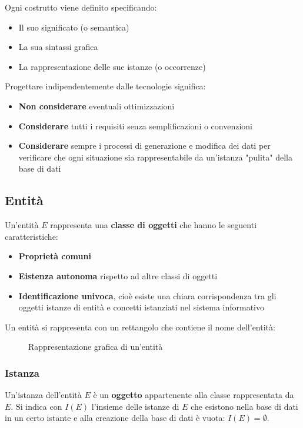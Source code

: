 \documentclass[a4paper]{article}
\begin{document}
\vspace{1em}
\noindent
Ogni costrutto viene definito specificando:
\begin{itemize}
  \item Il suo significato (o semantica)
  \item La sua sintassi grafica
  \item La rappresentazione delle sue istanze (o occorrenze)
\end{itemize}

\vspace{1em}
\noindent
Progettare indipendentemente dalle tecnologie significa:
\begin{itemize}
  \item \textbf{Non considerare} eventuali ottimizzazioni
  \item \textbf{Considerare} tutti i requisiti senza semplificazioni o convenzioni
  \item \textbf{Considerare} sempre i processi di generazione e modifica dei dati
    per verificare che ogni situazione sia rappresentabile da un'istanza "pulita"
    della base di dati
\end{itemize}

\subsection{Entità}
Un'entità \( E \) rappresenta una \textbf{classe di oggetti} che hanno le seguenti
caratteristiche:
\begin{itemize}
  \item \textbf{Proprietà comuni}
  \item \textbf{Eistenza autonoma} rispetto ad altre classi di oggetti
  \item \textbf{Identificazione univoca}, cioè esiste una chiara corrispondenza tra
    gli oggetti istanze di entità e concetti istanziati nel sistema informativo
\end{itemize}
Un entità si rappresenta con un rettangolo che contiene il nome dell'entità:
\begin{figure}[H]
  \centering
  \caption{Rappresentazione grafica di un'entità}
\end{figure}

\subsubsection{Istanza}
Un'istanza dell'entità \( E \) è un \textbf{oggetto} appartenente alla classe rappresentata
da \( E \). Si indica con \( I(E) \) l'insieme delle istanze di \( E \) che esistono
nella base di dati in un certo istante e alla creazione della base di dati è vuota:
\( I(E) = \emptyset \).
\end{document}
